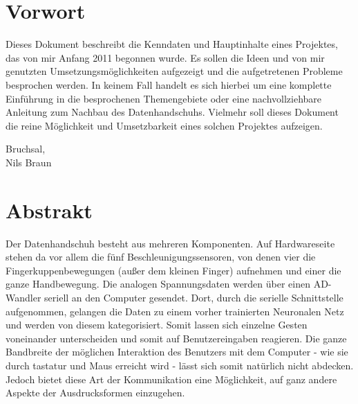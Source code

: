 \chapter{Vorwort}
Dieses Dokument beschreibt die Kenndaten und Hauptinhalte eines Projektes, das von mir Anfang 2011 begonnen wurde. Es sollen die Ideen und von mir genutzten Umsetzungsmöglichkeiten aufgezeigt und die aufgetretenen Probleme besprochen werden. In keinem Fall handelt es sich hierbei um eine komplette Einführung in die besprochenen Themengebiete oder eine nachvollziehbare Anleitung zum Nachbau des Datenhandschuhs. Vielmehr soll dieses Dokument die reine Möglichkeit und Umsetzbarkeit eines solchen Projektes aufzeigen.
\begin{flushright}
Bruchsal, \dates \\
Nils Braun 
\end{flushright}

\chapter{Abstrakt}
Der Datenhandschuh besteht aus mehreren Komponenten. Auf Hardwareseite stehen da vor allem die fünf Beschleunigungssensoren, von denen vier die Fingerkuppenbewegungen (außer dem kleinen Finger) aufnehmen und einer die ganze Handbewegung. Die analogen Spannungsdaten werden über einen AD-Wandler seriell an den Computer gesendet. Dort, durch die serielle Schnittstelle aufgenommen, gelangen die Daten zu einem vorher trainierten Neuronalen Netz und werden von diesem kategorisiert. Somit lassen sich einzelne Gesten voneinander unterscheiden und somit auf Benutzereingaben reagieren. Die ganze Bandbreite der möglichen Interaktion des Benutzers mit dem Computer - wie sie durch tastatur und Maus erreicht wird - lässt sich somit natürlich nicht abdecken. Jedoch bietet diese Art der Kommunikation eine Möglichkeit, auf ganz andere Aspekte der Ausdrucksformen einzugehen.
